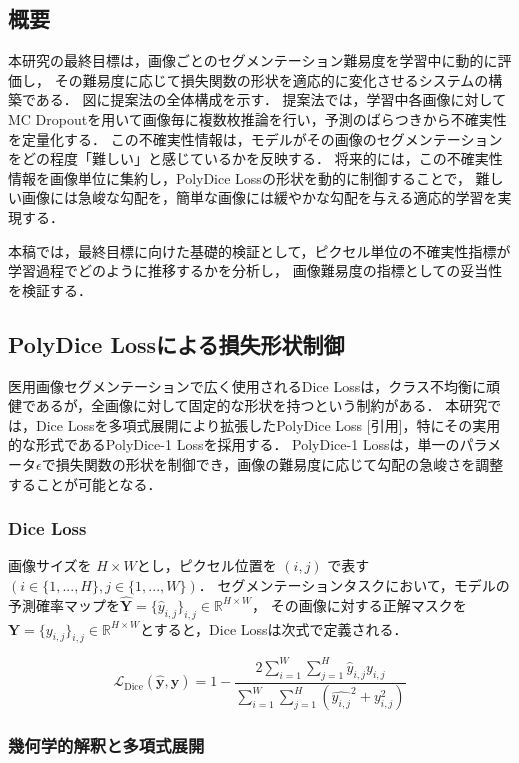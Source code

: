 \documentclass[10pt, a4paper, twocolumn]{jarticle}
\begin{document}
\subsection{概要}
本研究の最終目標は，画像ごとのセグメンテーション難易度を学習中に動的に評価し，
その難易度に応じて損失関数の形状を適応的に変化させるシステムの構築である．
図に提案法の全体構成を示す．
提案法では，学習中各画像に対してMC Dropoutを用いて画像毎に複数枚推論を行い，予測のばらつきから不確実性を定量化する．
この不確実性情報は，モデルがその画像のセグメンテーションをどの程度「難しい」と感じているかを反映する．
将来的には，この不確実性情報を画像単位に集約し，PolyDice Lossの形状を動的に制御することで，
難しい画像には急峻な勾配を，簡単な画像には緩やかな勾配を与える適応的学習を実現する．

本稿では，最終目標に向けた基礎的検証として，ピクセル単位の不確実性指標が学習過程でどのように推移するかを分析し，
画像難易度の指標としての妥当性を検証する．

\subsection{PolyDice Lossによる損失形状制御}
医用画像セグメンテーションで広く使用されるDice Lossは，クラス不均衡に頑健であるが，全画像に対して固定的な形状を持つという制約がある．
本研究では，Dice Lossを多項式展開により拡張したPolyDice Loss [引用]，特にその実用的な形式であるPolyDice-1 Lossを採用する．
PolyDice-1 Lossは，単一のパラメータ$\epsilon$で損失関数の形状を制御でき，画像の難易度に応じて勾配の急峻さを調整することが可能となる．

\subsubsection{Dice Loss}
画像サイズを $H \times W$とし，ピクセル位置を $(i, j)$ で表す$\left(i \in \{1, ..., H\}, j \in \{1, ..., W\}\right)$．
セグメンテーションタスクにおいて，モデルの予測確率マップを$\hat{\mathbf{Y}} = \{\hat{y}_{i,j}\}_{i,j} \in \mathbb R ^ {H \times W}$，
その画像に対する正解マスクを$\mathbf{Y} = \{{y}_{i,j}\}_{i,j} \in \mathbb R ^ {H \times W}$とすると，Dice Lossは次式で定義される．

\begin{equation}
  \mathcal{L}_{\text{Dice}}(\hat{\mathbf{y}}, \mathbf{y}) = 1 - \frac{2 \sum_{i=1}^{W} \sum_{j=1}^{H} \hat{y}_{i, j} y_{i, j}}{\sum_{i=1}^{W} \sum_{j=1}^{H}(\hat{y_{i, j}} ^ 2 + y_{i, j} ^ 2)}
\end{equation}

\subsubsection{幾何学的解釈と多項式展開}
\end{document}
